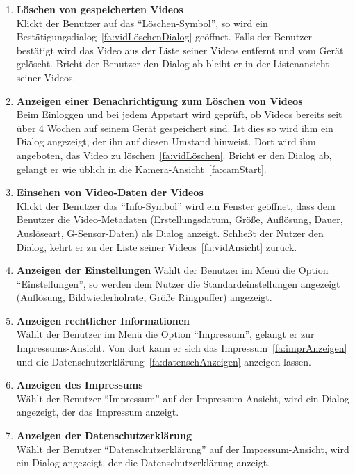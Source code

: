 \begin{enumerate}
\item \label{fa:vidLöschen}\textbf{Löschen von gespeicherten Videos} \hfill \\
Klickt der Benutzer auf das ``Löschen-Symbol'', so wird ein Bestätigungsdialog~\eqref{fa:vidLöschenDialog} geöffnet. Falls der Benutzer bestätigt wird das Video aus der Liste seiner  Videos entfernt und vom Gerät gelöscht. Bricht der Benutzer den Dialog ab bleibt er in der Listenansicht seiner Videos.

\item \label{fa:vidLöschenDialog}\textbf{Anzeigen einer Benachrichtigung zum Löschen von Videos} \hfill \\
Beim Einloggen und bei jedem Appstart wird geprüft, ob  Videos bereits seit über 4 Wochen auf seinem Gerät gespeichert sind. Ist dies so wird ihm ein Dialog angezeigt, der ihn auf diesen Umstand hinweist. Dort wird ihm angeboten, das Video zu löschen~\eqref{fa:vidLöschen}. Bricht er den Dialog ab, gelangt er wie üblich in die Kamera-Ansicht~\eqref{fa:camStart}.

\item \label{fa:metaVerschlVid}\textbf{Einsehen von Video-Daten der  Videos} \hfill \\
Klickt der Benutzer das ``Info-Symbol'' wird ein Fenster geöffnet, dass dem Benutzer die Video-\gls{Metadaten} (Erstellungsdatum, Größe, Auflösung, Dauer, Auslöseart, \gls{G-Sensor}-Daten) als Dialog anzeigt. Schließt der Nutzer den Dialog, kehrt er zu der Liste seiner Videos~\eqref{fa:vidAnsicht} zurück.

\item \label{fa:einstAnsicht}\textbf{Anzeigen der Einstellungen}
Wählt der Benutzer im Menü die Option ``Einstellungen'', so werden dem Nutzer die Standardeinstellungen angezeigt (Auflösung, Bildwiederholrate, Größe \gls{Ringpuffer}) angezeigt.

\item \label{fa:imprAnsicht}\textbf{Anzeigen rechtlicher Informationen} \hfill \\
Wählt der Benutzer im Menü die Option ``Impressum'', gelangt er zur Impressums-Ansicht. Von dort kann er sich das Impressum~\eqref{fa:imprAnzeigen} und die Datenschutzerklärung~\eqref{fa:datenschAnzeigen} anzeigen lassen.

\item \label{fa:imprAnzeigen}\textbf{Anzeigen des Impressums} \hfill \\
Wählt der Benutzer ``Impressum'' auf der Impressum-Ansicht, wird ein Dialog angezeigt, der das Impressum anzeigt.

\item  \label{fa:datenschAnzeigen}\textbf{Anzeigen der Datenschutzerklärung} \hfill \\
Wählt der Benutzer ``Datenschutzerklärung'' auf der Impressum-Ansicht, wird ein Dialog angezeigt, der die Datenschutzerklärung anzeigt.

\end{enumerate}


